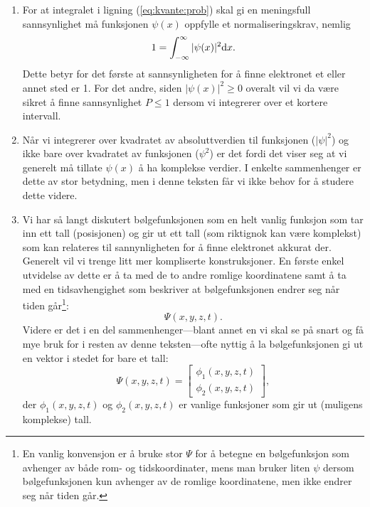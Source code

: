 \begin{enumerate}
\item
For at integralet i ligning (\ref{eq:kvante:prob}) skal gi en meningsfull sannsynlighet må funksjonen $\psi(x)$ oppfylle et normaliseringskrav, nemlig 
\begin{displaymath}
	1 = \int_{-\infty}^\infty |\psi(x)|^2\text{d} x.
\end{displaymath}
Dette betyr for det første at sannsynligheten for å finne elektronet et eller annet sted er 1. For det andre, siden $|\psi(x)|^2 \geq 0$ overalt vil vi da være sikret å finne sannsynlighet $P\leq1$ dersom vi integrerer over et kortere intervall.
\item
Når vi integrerer over kvadratet av absoluttverdien til funksjonen ($|\psi|^2$) og ikke bare over kvadratet av funksjonen ($\psi^2$) er det fordi det viser seg at vi generelt må tillate $\psi(x)$ å ha komplekse verdier. I enkelte sammenhenger er dette av stor betydning, men i denne teksten får vi ikke behov for å studere dette videre.
\item
Vi har så langt diskutert bølgefunksjonen som en helt vanlig funksjon som tar inn ett tall (posisjonen) og gir ut ett tall (som riktignok kan være komplekst) som kan relateres til sannynligheten for å finne elektronet akkurat der. Generelt vil vi trenge litt mer kompliserte konstruksjoner. En første enkel utvidelse av dette er å ta med de to andre romlige koordinatene samt å ta med en tidsavhengighet som beskriver at bølgefunksjonen endrer seg når tiden går\footnote{En vanlig konvensjon er å bruke stor $\Psi$ for å betegne en bølgefunksjon som avhenger av både rom- og tidskoordinater, mens man bruker liten $\psi$ dersom bølgefunksjonen kun avhenger av de romlige koordinatene, men ikke endrer seg når tiden går.}:
\begin{displaymath}
	\Psi(x,y,z,t).
\end{displaymath}
Videre er det i en del sammenhenger---blant annet en vi skal se på snart og få mye bruk for i resten av denne teksten---ofte nyttig å la bølgefunksjonen gi ut en vektor i stedet for bare et tall:
\begin{displaymath}
	\Psi(x,y,z,t) = \left[ \begin{array}{cc}\phi_1(x,y,z,t) \\ \phi_2(x,y,z,t) \end{array}\right],
\end{displaymath}
der $\phi_1(x,y,z,t)$ og $\phi_2(x,y,z,t)$ er vanlige funksjoner som gir ut (muligens komplekse) tall.
\end{enumerate}

